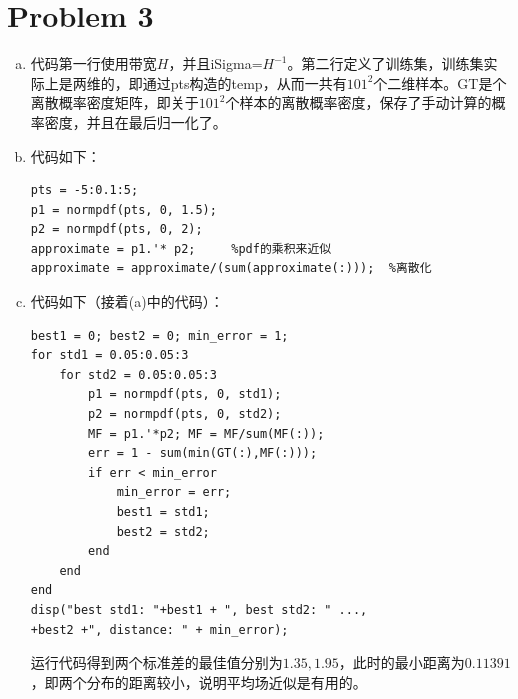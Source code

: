 \documentclass[a4paper,UTF8]{article}
\numberwithin{equation}{section}
\begin{document}
\section*{Problem 3}
\begin{enumerate}[(a)]
	\item 代码第一行使用带宽$H$，并且iSigma=$H^{-1}$。第二行定义了训练集，训练集实际上是两维的，即通过pts构造的temp，从而一共有$101^2$个二维样本。GT是个离散概率密度矩阵，即关于$101^2$个样本的离散概率密度，保存了手动计算的概率密度，并且在最后归一化了。
	\item 代码如下：
\begin{lstlisting}
pts = -5:0.1:5;
p1 = normpdf(pts, 0, 1.5);
p2 = normpdf(pts, 0, 2);
approximate = p1.'* p2;     %pdf的乘积来近似
approximate = approximate/(sum(approximate(:)));  %离散化
\end{lstlisting}
    \item 代码如下（接着(a)中的代码）：
\begin{lstlisting}
best1 = 0; best2 = 0; min_error = 1;
for std1 = 0.05:0.05:3
    for std2 = 0.05:0.05:3
        p1 = normpdf(pts, 0, std1);
        p2 = normpdf(pts, 0, std2);
        MF = p1.'*p2; MF = MF/sum(MF(:));
        err = 1 - sum(min(GT(:),MF(:)));
        if err < min_error
            min_error = err;
            best1 = std1;
            best2 = std2;
        end
    end
end
disp("best std1: "+best1 + ", best std2: " ...,
+best2 +", distance: " + min_error);
\end{lstlisting}
运行代码得到两个标准差的最佳值分别为$1.35,1.95$，此时的最小距离为$0.11391$，即两个分布的距离较小，说明平均场近似是有用的。
\end{enumerate}
\end{document}
